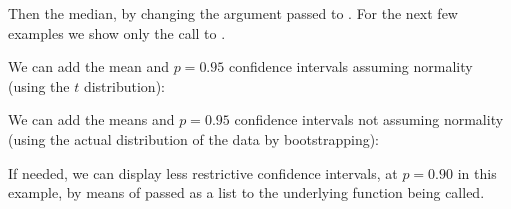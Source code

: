 \documentclass[krantz2]{krantz}\usepackage{knitr}%
\begin{document}
Then the median, by changing the argument passed to . For the next few examples we show only the call to .

\begin{knitrout}\footnotesize
{}\color{fgcolor}\begin{kframe}
\begin{alltt}
  \hlstd{(} \hlstd{=} \hlstd{,}  \hlstd{=} \hlstd{,}  \hlstd{=} \hlstd{,}  \hlstd{=} \hlstd{,}  \hlstd{=} \hlstd{)}
\end{alltt}
\end{kframe}
\end{knitrout}

We can add the mean and $p = 0.95$ confidence intervals assuming normality (using the $t$ distribution):

\begin{knitrout}\footnotesize
{}\color{fgcolor}\begin{kframe}
\begin{alltt}
  \hlstd{(} \hlstd{=} \hlstd{,}  \hlstd{=} \hlstd{,}  \hlstd{=} \hlstd{,}  \hlstd{=} \hlstd{)}
\end{alltt}
\end{kframe}
\end{knitrout}

We can add the means and $p = 0.95$ confidence intervals not assuming normality (using the actual distribution of the data by bootstrapping):

\begin{knitrout}\footnotesize
{}\color{fgcolor}\begin{kframe}
\begin{alltt}
  \hlstd{(} \hlstd{=} \hlstd{,}  \hlstd{=} \hlstd{,}  \hlstd{=} \hlstd{,}  \hlstd{=} \hlstd{)}
\end{alltt}
\end{kframe}
\end{knitrout}

If needed, we can display less restrictive confidence intervals, at $p = 0.90$ in this example, by means of  passed as a list to the underlying function being called.
\end{document}
